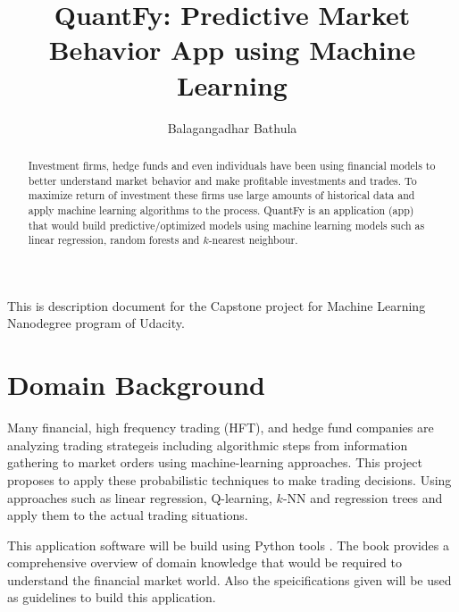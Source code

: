 \documentclass[12pt]{article}
\title{QuantFy: Predictive Market Behavior App using Machine Learning }
\author{Balagangadhar Bathula}
\begin{document}
\maketitle

\begin{abstract}
Investment firms, hedge funds and even individuals have been using financial models to better understand market behavior and make profitable investments and trades.  To maximize return of investment these firms use large amounts of historical data and apply machine learning algorithms to the process.
QuantFy is an application (app) that would build predictive/optimized models using machine learning models such as linear regression, random forests and $k$-nearest neighbour. 


\end{abstract}

\newpage
\tableofcontents
\newpage

This is description document for the Capstone project for Machine Learning Nanodegree program of Udacity. 

\section{Domain Background}
\label{sec:background}
Many financial, high frequency trading (HFT), and hedge fund companies are analyzing trading strategeis including algorithmic steps from information gathering to market orders using machine-learning approaches. This project proposes to apply these probabilistic techniques to make trading decisions. Using approaches such as linear regression, Q-learning, $k$-NN and regression trees and apply them to the actual trading situations.

This application software will be build using Python tools \cite{PyFi}. The book \cite{HeFu} provides a comprehensive overview of domain knowledge that would be required to understand the financial market world. Also the speicifications given \cite{GeTechCourse} will be used as guidelines to build this application. 
\end{document}
